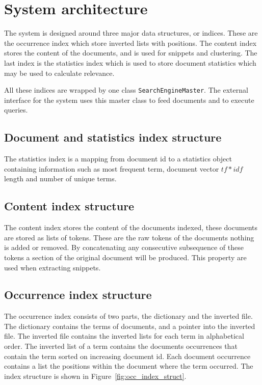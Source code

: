 \chapter{System architecture}
\label{sec:architecture}
\thispagestyle{fancy}
The system is designed around three major data structures, or indices. These are the occurrence index which store inverted lists with positions. The content index stores the content of the documents, and is used for snippets and clustering. The last index is the statistics index which is used to store document statistics which may be used to calculate relevance. 

All these indices are wrapped by one class \texttt{SearchEngineMaster}. The external interface for the system uses this master class to feed documents and to execute queries.  

\section{Document and statistics index structure}\label{sub:statistics_index_structure}
The statistics index is a mapping from document id to a statistics object containing information such as most frequent term, document vector $tf*idf$ length and number of unique terms.

\section{Content index structure}\label{sub:content_index_structure}
The content index stores the content of the documents indexed, these documents are stored as lists of tokens. These are the raw tokens of the documents nothing is added or removed. By concatenating any consecutive subsequence of these tokens a section of the original document will be produced. This property are used when extracting snippets.  

\section{Occurrence index structure}\label{sub:occurrence_index_structure}
The occurrence index consists of two parts, the dictionary and the inverted file. The dictionary contains the terms of documents, and a pointer into the inverted file. The inverted file contains the inverted lists for each term in alphabetical order. The inverted list of a term contains the documents occurrences that contain the term sorted on increasing document id. Each document occurrence contains a list the positions within the document where the term occurred. The index structure is shown in Figure~\ref{fig:occ_index_struct}.

